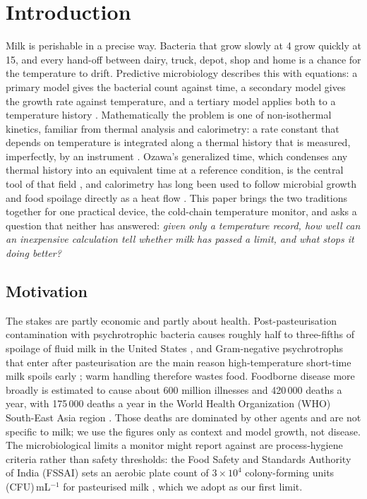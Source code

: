 \section{Introduction}\label{sec:intro}
Milk is perishable in a precise way. Bacteria that grow slowly at 4\degC{} grow quickly at 15\degC, and every hand-off between dairy, truck, depot, shop and home is a chance for the temperature to drift. Predictive microbiology describes this with equations: a primary model gives the bacterial count against time, a secondary model gives the growth rate against temperature, and a tertiary model applies both to a temperature history \cite{perez2013,tarlak2023,stavropoulou2019}. Mathematically the problem is one of non-isothermal kinetics, familiar from thermal analysis and calorimetry: a rate constant that depends on temperature is integrated along a thermal history that is measured, imperfectly, by an instrument \cite{vyazovkin2011,vyazovkin2015,koga2023}. Ozawa's generalized time, which condenses any thermal history into an equivalent time at a reference condition, is the central tool of that field \cite{ozawa1965,ozawa1986,koga2013,malek2013}, and calorimetry has long been used to follow microbial growth and food spoilage directly as a heat flow \cite{schiraldi2019,fessas2017,wadso2011,haman2019,fricke2020}. This paper brings the two traditions together for one practical device, the cold-chain temperature monitor, and asks a question that neither has answered: \emph{given only a temperature record, how well can an inexpensive calculation tell whether milk has passed a limit, and what stops it doing better?}

\subsection{Motivation}\label{sec:why}
The stakes are partly economic and partly about health. Post-pasteurisation contamination with psychrotrophic bacteria causes roughly half to three-fifths of spoilage of fluid milk in the United States \cite{martin2021}, and Gram-negative psychrotrophs that enter after pasteurisation are the main reason high-temperature short-time milk spoils early \cite{ranieri2009}; warm handling therefore wastes food. Foodborne disease more broadly is estimated to cause about 600 million illnesses and 420\,000 deaths a year, with 175\,000 deaths a year in the World Health Organization (WHO) South-East Asia region \cite{who2015}. Those deaths are dominated by other agents and are not specific to milk; we use the figures only as context and model growth, not disease. The microbiological limits a monitor might report against are process-hygiene criteria rather than safety thresholds: the Food Safety and Standards Authority of India (FSSAI) sets an aerobic plate count of $3\times10^4$ colony-forming units (CFU)\,mL$^{-1}$ for pasteurised milk \cite{fssai2024}, which we adopt as our first limit.

